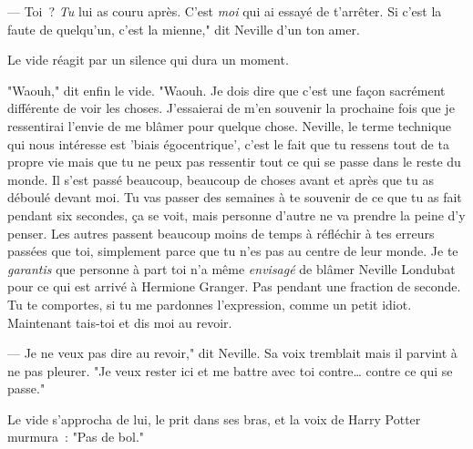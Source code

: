 --- Toi~? \emph{Tu} lui as couru après. C'est \emph{moi} qui ai essayé de t'arrêter. Si c'est la faute de quelqu'un, c'est la mienne," dit Neville d'un ton amer.

Le vide réagit par un silence qui dura un moment.

"Waouh," dit enfin le vide. "Waouh. Je dois dire que c'est une façon sacrément différente de voir les choses. J'essaierai de m'en souvenir la prochaine fois que je ressentirai l'envie de me blâmer pour quelque chose. Neville, le terme technique qui nous intéresse est 'biais égocentrique', c'est le fait que tu ressens tout de ta propre vie mais que tu ne peux pas ressentir tout ce qui se passe dans le reste du monde. Il s'est passé beaucoup, beaucoup de choses avant et après que tu as déboulé devant moi. Tu vas passer des semaines à te souvenir de ce que tu as fait pendant six secondes, ça se voit, mais personne d'autre ne va prendre la peine d'y penser. Les autres passent beaucoup moins de temps à réfléchir à tes erreurs passées que toi, simplement parce que tu n'es pas au centre de leur monde. Je te \emph{garantis} que personne à part toi n'a même \emph{envisagé} de blâmer Neville Londubat pour ce qui est arrivé à Hermione Granger. Pas pendant une fraction de seconde. Tu te comportes, si tu me pardonnes l'expression, comme un petit idiot. Maintenant tais-toi et dis moi au revoir.

--- Je ne veux pas dire au revoir," dit Neville. Sa voix tremblait mais il parvint à ne pas pleurer. "Je veux rester ici et me battre avec toi contre… contre ce qui se passe."

Le vide s'approcha de lui, le prit dans ses bras, et la voix de Harry Potter murmura~: "Pas de bol." 

